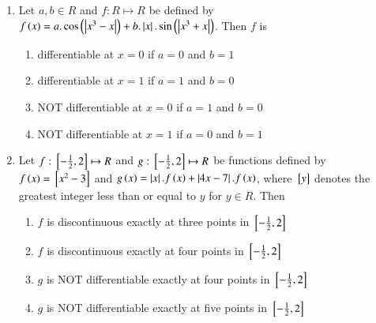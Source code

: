 \documentclass[journal,12pt,twocolumn]{IEEEtran}
\theoremstyle{remark}
\begin{document}
\begin{enumerate}
    \item 
	    Let $a, b\in R$ and $f: R\mapsto R$ be defined by $f\left(x\right)=a.\cos \left(\left\vert x^3-x\right\vert\right) +b.\left\vert x\right\vert.\sin \left(\left\vert x^3+x\right\vert\right)$. Then $f$ is   
        
    \hfill 
    {}
    
    \begin{enumerate}[label=(\alph*)]
        
        \item differentiable at $x=0$ if $a=0$ and $b=1$
        \item differentiable at $x=1$ if $a=1$ and $b=0$
        \item {NOT} differentiable at $x=0$ if $a=1$ and $b=0$
        \item {NOT} differentiable at $x=1$ if $a=0$ and $b=1$
    \end{enumerate}


    \item 
	    Let $f:{}\left[-\frac{1}{2}, 2\right]\mapsto R$ and $g:{}\left[-\frac{1}{2}, 2\right]\mapsto R$ be functions defined by $f\left(x\right)={}\left[x^2-3\right]$ and $g\left(x\right)=\left\vert x\right\vert.f\left(x\right)+\left\vert4x-7\right\vert.f\left(x\right)$, where ${}\left[y\right]$ denotes the greatest integer less than or equal to $y$ for $y\in R$. Then   
        
    \hfill 
    {}
    
    \begin{enumerate}[label=(\alph*)]
        
        \item $f$ is discontinuous exactly at three points in ${}\left[-\frac{1}{2}, 2\right]$
        \item $f$ is discontinuous exactly at four points in ${}\left[-\frac{1}{2}, 2\right]$
        \item $g$ is NOT differentiable exactly at four points in ${}\left[-\frac{1}{2}, 2\right]$
        \item $g$ is NOT differentiable exactly at five points in ${}\left[-\frac{1}{2}, 2\right]$
    \end{enumerate}

\end{enumerate}
\end{document}
